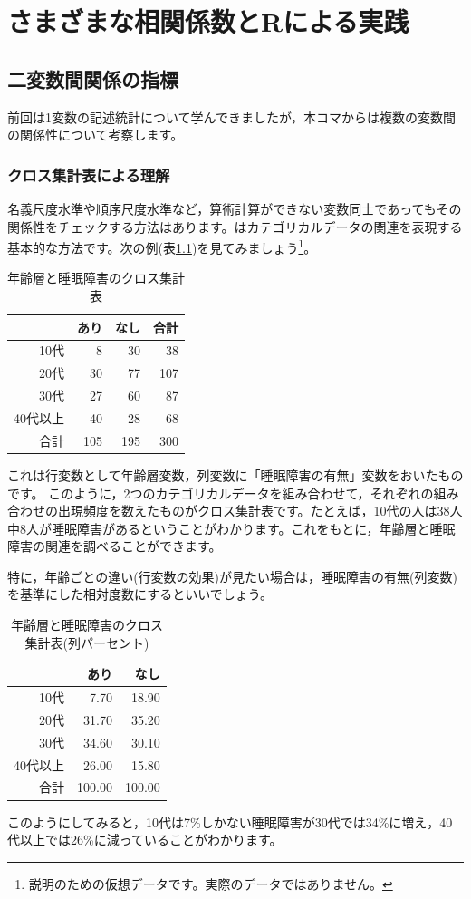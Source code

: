 \documentclass{ltjsbook}
\begin{document}
\VerbatimFootnotes
\chapter{さまざまな相関係数とRによる実践}
\label{ch06_Corr}
\section{二変数間関係の指標}
前回は1変数の記述統計について学んできましたが，本コマからは複数の変数間の関係性について考察します。

\subsection{クロス集計表による理解}
名義尺度水準や順序尺度水準など，算術計算ができない変数同士であってもその関係性をチェックする方法はあります。はカテゴリカルデータの関連を表現する基本的な方法です。次の例(表\ref{tbl:06_01})を見てみましょう\footnote{説明のための仮想データです。実際のデータではありません。}。
\begin{table}[ht]
\centering
\caption{年齢層と睡眠障害のクロス集計表} 
\begin{tabular}{rrrr}
  \hline
 & あり & なし & 合計 \\ 
  \hline
10代 & 8 & 30 & 38 \\ 
  20代 & 30 & 77 & 107 \\ 
  30代 & 27 & 60 & 87 \\ 
  40代以上 & 40 & 28 & 68 \\ 
  合計 & 105 & 195 & 300 \\ 
   \hline
\end{tabular}
\label{tbl:06_01}
\end{table}
これは行変数として年齢層変数，列変数に「睡眠障害の有無」変数をおいたものです。
このように，2つのカテゴリカルデータを組み合わせて，それぞれの組み合わせの出現頻度を数えたものがクロス集計表です。たとえば，10代の人は38人中8人が睡眠障害があるということがわかります。これをもとに，年齢層と睡眠障害の関連を調べることができます。

特に，年齢ごとの違い(行変数の効果)が見たい場合は，睡眠障害の有無(列変数)を基準にした相対度数にするといいでしょう。
\begin{table}[ht]
\centering
\caption{年齢層と睡眠障害のクロス集計表(列パーセント)} 
\label{tbl:06_02}
\begin{tabular}{rrr}
  \hline
 & あり & なし \\ 
  \hline
10代 & 7.70 & 18.90 \\ 
  20代 & 31.70 & 35.20 \\ 
  30代 & 34.60 & 30.10 \\ 
  40代以上 & 26.00 & 15.80 \\ 
   \hline
合計 & 100.00 & 100.00 \\ 
   \hline
\end{tabular}
\end{table}
このようにしてみると，10代は7\%しかない睡眠障害が30代では34\%に増え，40代以上では26\%に減っていることがわかります。
\end{document}

